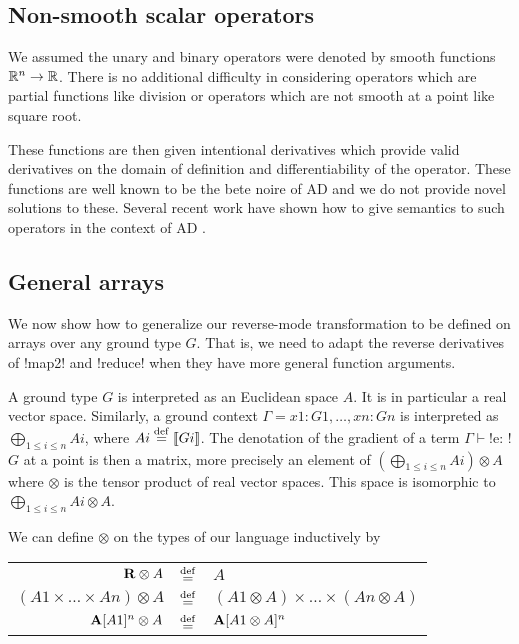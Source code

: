 \subsection{Non-smooth scalar operators} %
\label{sub:lift_non_smooth}

We assumed the unary and binary operators were denoted by smooth functions $\mathbb{R}^n\to\mathbb{R}$. 
There is no additional difficulty in considering operators which are partial functions 
like division or operators which are not smooth at a point like square root.

These functions are then given intentional derivatives which provide valid derivatives 
on the domain of definition and differentiability of the operator. 
These functions are well known to be the bete noire of AD \cite{griewank2008evaluating} 
and we do not provide novel solutions to these.  
Several recent work have shown how to give semantics to such operators in the context of AD \cite{vakar2020denotational,mazza2021automatic,sherman2021,lee2020correctness}.

\subsection{General arrays} %
\label{sub:lift_gen_arr}

We now show how to generalize our reverse-mode transformation to be defined on arrays over any ground type $G$.
That is, we need to adapt the reverse derivatives of !map2! and !reduce! when they have more general function arguments.

A ground type $G$ is interpreted as an Euclidean space $A$. 
It is in particular a real vector space.
Similarly, a ground context $\Gamma=x1:G1,\ldots,xn:Gn$ is interpreted as $\bigoplus_{1\leq i\leq n}Ai$, where $Ai\stackrel {\mathrm{def}}=\llbracket Gi\rrbracket$.
The denotation of the gradient of a term $\Gamma \vdash$!e: !$G$ at a point is then a matrix, more precisely an element of $(\bigoplus_{1\leq i\leq n}Ai)\otimes A$
where $\otimes$ is the tensor product of real vector spaces. This space is isomorphic to $\bigoplus_{1\leq i\leq n}Ai\otimes A$.

We can define $\otimes$ on the types of our language inductively by

\begin{tabular}{r c l}
    $\mathbf{R} \otimes A$ & $\stackrel {\mathrm{def}}=$ & $A$ \\
    $(A1 \times \ldots \times An)\otimes A$ & $\stackrel {\mathrm{def}}=$ & $(A1\otimes A) \times \ldots \times (An \otimes A)$ \\
    $\mathbf{A}[A1]^{n} \otimes A$ & $\stackrel {\mathrm{def}}=$ & $\mathbf{A}[A1\otimes A]^{n}$
\end{tabular}

